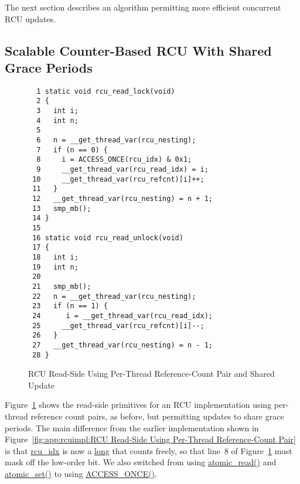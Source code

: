 The next section describes an algorithm permitting more efficient
concurrent RCU updates.

\subsection{Scalable Counter-Based RCU With Shared Grace Periods}
\label{app:rcuimpl:Scalable Counter-Based RCU With Shared Grace Periods}

\begin{figure}[tbp]
{ \scriptsize
\begin{verbatim}
  1 static void rcu_read_lock(void)
  2 {
  3   int i;
  4   int n;
  5 
  6   n = __get_thread_var(rcu_nesting);
  7   if (n == 0) {
  8     i = ACCESS_ONCE(rcu_idx) & 0x1;
  9     __get_thread_var(rcu_read_idx) = i;
 10     __get_thread_var(rcu_refcnt)[i]++;
 11   }
 12   __get_thread_var(rcu_nesting) = n + 1;
 13   smp_mb();
 14 }
 15 
 16 static void rcu_read_unlock(void)
 17 {
 18   int i;
 19   int n;
 20 
 21   smp_mb();
 22   n = __get_thread_var(rcu_nesting);
 23   if (n == 1) {
 24      i = __get_thread_var(rcu_read_idx);
 25     __get_thread_var(rcu_refcnt)[i]--;
 26   }
 27   __get_thread_var(rcu_nesting) = n - 1;
 28 }
\end{verbatim}
}
\caption{RCU Read-Side Using Per-Thread Reference-Count Pair and Shared Update}
\label{fig:app:rcuimpl:RCU Read-Side Using Per-Thread Reference-Count Pair and Shared Update}
\end{figure}

Figure~\ref{fig:app:rcuimpl:RCU Read-Side Using Per-Thread Reference-Count Pair and Shared Update}
shows the read-side primitives for an RCU implementation using per-thread
reference count pairs, as before, but permitting updates to share
grace periods.
The main difference from the earlier implementation shown in
Figure~\ref{fig:app:rcuimpl:RCU Read-Side Using Per-Thread Reference-Count Pair}
is that \url{rcu_idx} is now a \url{long} that counts freely,
so that line~8 of
Figure~\ref{fig:app:rcuimpl:RCU Read-Side Using Per-Thread Reference-Count Pair and Shared Update}
must mask off the low-order bit.
We also switched from using \url{atomic_read()} and \url{atomic_set()}
to using \url{ACCESS_ONCE()}.

